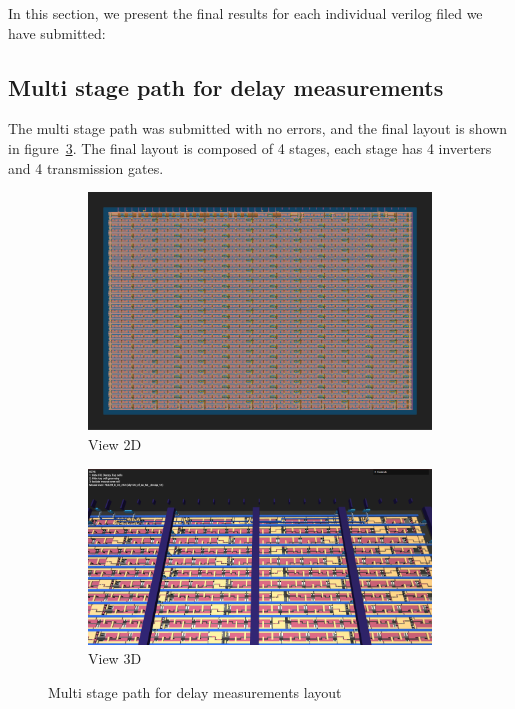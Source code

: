 In this section, we present the final results for each individual verilog filed we have submitted:

\subsection{Multi stage path for delay measurements}
The multi stage path was submitted with no errors, and the final layout is shown in figure\ \ref{fig:delay_Layout}. The final layout is composed of 4 stages, each stage has 4 inverters and 4 transmission gates.
\begin{figure}[H]
    \centering
    \begin{subfigure}[b]{0.45\textwidth}
        \includegraphics[width=\linewidth]{Pictures/Result_Delay_2D_View.png}
        \caption{View 2D}\label{fig:delay_2D}
    \end{subfigure}
    \begin{subfigure}[b]{0.45\textwidth}
        \includegraphics[width=\linewidth]{Pictures/Result_Delay_3D_View.png}
        \caption{View 3D}\label{fig:delay_3D}
    \end{subfigure}
    \caption{Multi stage path for delay measurements layout}\label{fig:delay_Layout}
\end{figure}

